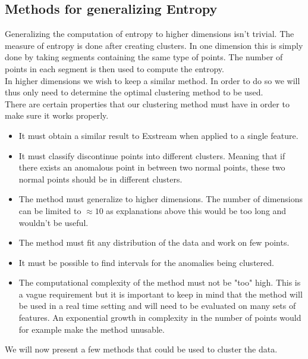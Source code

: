 \documentclass[oneside, a4paper, onecolumn, 11pt]{article}
\begin{document}
\subsection{Methods for generalizing Entropy}
Generalizing the computation of entropy to higher dimensions isn't trivial. The measure of entropy is done after creating clusters. In one dimension this is simply done by taking segments containing the same type of points. The number of points in each segment is then used to compute the entropy.\\
In higher dimensions we wish to keep a similar method. In order to do so we will thus only need to determine the optimal clustering method to be used.\\
There are certain properties that our clustering method must have in order to make sure it works properly.
\begin{itemize}
  \item It must obtain a similar result to Exstream when applied to a single feature.
  \item It must classify discontinue points into different clusters. Meaning that if there exists an anomalous point in between two normal points, these two normal points should be in different clusters.
  \item The method must generalize to higher dimensions. The number of dimensions can be limited to $\approx10$ as explanations above this would be too long and wouldn't be useful.
  \item The method must fit any distribution of the data and work on few points.
  \item It must be possible to find intervals for the anomalies being clustered.
  \item The computational complexity of the method must not be "too" high. This is a vague requirement but it is important to keep in mind that the method will be used in a real time setting and will need to be evaluated on many sets of features. An exponential growth in complexity in the number of points would for example make the method unusable.
\end{itemize}
We will now present a few methods that could be used to cluster the data.
\end{document}
